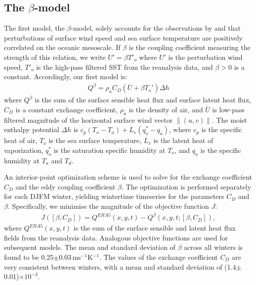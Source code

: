\subsection{The $\beta$-model}
The first model, the $\beta$-model, solely accounts for the observations by \citet{Chelton2004} and \citet{ONeill2010} that perturbations of surface wind speed and sea surface temperature are positively correlated on the oceanic mesoscale. If $\beta$ is the coupling coefficient measuring the strength of this relation, we write $U' = \beta T'_o$ where $U'$ is the perturbation wind speed, $T'_o$ is the high-pass filtered SST from the reanalysis data, and $\beta >0$ is a constant. Accordingly, our first model is:
\begin{align}
    Q^\beta  = \rho_a C_D (\overline{U} + \beta T_o')\Delta h\label{eq:beta_model}
\end{align}
where $Q^\beta$ is the sum of the surface sensible heat flux and surface latent heat flux, $C_D$ is a constant exchange coefficient, $\rho_a$ is the density of air, and $\overline{U}$ is low-pass filtered magnitude of the horizontal surface wind vector $\left\lVert (u,v) \right\rVert$. The moist enthalpy potential  $\Delta h$ is $c_p (T_o-T_a)+L_v(q_o^*-q_a)$, where $c_p$ is the specific heat of air, $T_o$ is the sea surface temperature, $L_v$ is the latent heat of vaporization, $q_o^*$ is the saturation specific humidity at $T_o$, and $q_a$ is the specific humidity at $T_a$ and $T_d$.\par 


An interior-point optimization scheme is used to solve for the exchange coefficient $C_D$ and the eddy coupling coefficient $\beta$. The optimization is performed separately for each DJFM winter, yielding wintertime timeseries for the parameters $C_D$ and $\beta$. Specifically, we minimise the magnitude of the objective function $J$:
\begin{align}
J([\beta, C_D]) = 
Q^{ERA5}(x,y,t) - Q^\beta(x,y,t;[\beta,C_D]),
\end{align}
where $Q^{ERA5}(x,y,t)$ is the sum of the surface sensible and latent heat flux fields from the reanalysis data. Analogous objective functions are used for subsequent models. The mean and standard deviation of $\beta$ across all winters is found to be 0.25$\pm$0.03\,ms$^{-1}$K$^{-1}$. The values of the exchange coefficient $C_D$ are very consistent between winters, with a mean and standard deviation of (1.4$\pm$0.01)$\times10^{-3}$. \par 

